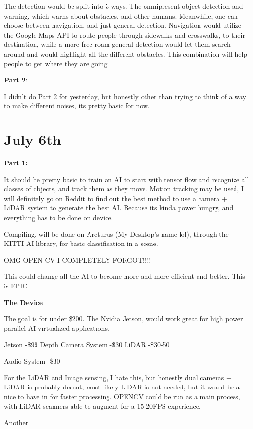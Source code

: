 \documentclass{article}
\begin{document}
The detection would be split into 3 ways. The omnipresent object detection and warning, which warns about obstacles, and other humans. Meanwhile, one can choose between navigation, and just general detection. Navigation would utilize the Google Maps API to route people through sidewalks and crosswalks, to their destination, while a more free roam general detection would let them search around and would highlight all the different obstacles. This combination will help people to get where they are going.

\textbf{Part 2:}

I didn't do Part 2 for yesterday, but honestly other than trying to think of a way to make different noises, its pretty basic for now. 



\section{July 6th}

\textbf{Part 1:}

It should be pretty basic to train an AI to start with tensor flow and recognize all classes of objects, and track them as they move. Motion tracking may be used, I will definitely go on Reddit to find out the best method to use a camera + LiDAR system to generate the best AI. Because its kinda power hungry, and everything has to be done on device.

Compiling, will be done on Arcturus (My Desktop's name lol), through the KITTI AI library, for basic classification in a scene.

OMG OPEN CV I COMPLETELY FORGOT!!!!

This could change all the AI to become more and more efficient and better. This is EPIC

\textbf{The Device}

The goal is for under \$200. The Nvidia Jetson, would work great for high power parallel AI virtualized applications. 

Jetson -\$99
Depth Camera System -\$30
LiDAR -\$30-50

Audio System -\$30


For the LiDAR and Image sensing, I hate this, but honestly dual cameras + LiDAR is probably decent, most likely LiDAR is not needed, but it would be a nice to have in for faster processing. OPENCV could be run as a main process, with LiDAR scanners able to augment for a 15-20FPS experience. 

Another 
\end{document}
